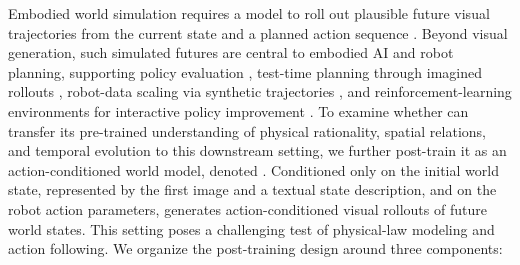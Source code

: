 Embodied world simulation requires a model to roll out plausible future visual trajectories from the current state and a planned action sequence \cite{veorobotics2025,zhu2025unified}.
Beyond visual generation, such simulated futures are central to embodied AI and robot planning, supporting policy evaluation \cite{veorobotics2025,tseng2026sc3}, test-time planning through imagined rollouts \cite{wan2026worldagen}, robot-data scaling via synthetic trajectories \cite{guo2025ctrl}, and reinforcement-learning environments for interactive policy improvement \cite{guo2026vlaw,jiang2026wovr}.
To examine whether \method can transfer its pre-trained understanding of physical rationality, spatial relations, and temporal evolution to this downstream setting, we further post-train it as an action-conditioned world model, denoted \acwm.
Conditioned only on the initial world state, represented by the first image and a textual state description, and on the robot action parameters, \acwm generates action-conditioned visual rollouts of future world states. This setting poses a challenging test of physical-law modeling and action following. We organize the post-training design around three components:
